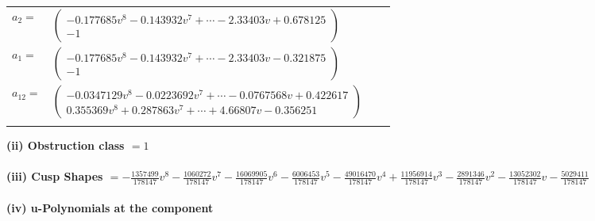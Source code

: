 \documentclass[1p]{elsarticle_modified}
\theoremstyle{definition}
\begin{document}
\begin{tabular}{m{7pt} m{180pt} m{7pt} m{180pt} }
\flushright $a_{2}=$&$\begin{pmatrix}-0.177685 v^{8}-0.143932 v^{7}+\cdots-2.33403 v+0.678125\\-1\end{pmatrix}$ \\
\flushright $a_{1}=$&$\begin{pmatrix}-0.177685 v^{8}-0.143932 v^{7}+\cdots-2.33403 v-0.321875\\-1\end{pmatrix}$ \\
\flushright $a_{12}=$&$\begin{pmatrix}-0.0347129 v^{8}-0.0223692 v^{7}+\cdots-0.0767568 v+0.422617\\0.355369 v^{8}+0.287863 v^{7}+\cdots+4.66807 v-0.356251\end{pmatrix}$\\&\end{tabular}
\flushleft \textbf{(ii) Obstruction class $= 1$}\\~\\
\flushleft \textbf{(iii) Cusp Shapes $= -\frac{1357499}{178147} v^8-\frac{1060272}{178147} v^7-\frac{16069905}{178147} v^6-\frac{6006453}{178147} v^5-\frac{49016470}{178147} v^4+\frac{11956914}{178147} v^3-\frac{2891346}{178147} v^2-\frac{13052302}{178147} v-\frac{5029411}{178147}$}\\~\\
\newpage\renewcommand{\arraystretch}{1}
\flushleft \textbf{(iv) u-Polynomials at the component}\newline \\
\end{document}
